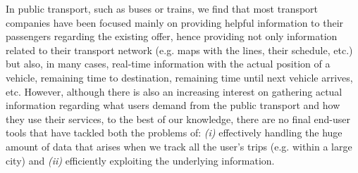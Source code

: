     In public transport, such as buses or trains, we find that most transport companies have been focused mainly on providing helpful information to their passengers regarding the existing offer, hence providing not only information related to their transport network (e.g. maps with the lines, their schedule, etc.) but also, in many cases, real-time information with the actual position of a vehicle, remaining time to destination, remaining time until next vehicle arrives, etc. 
    However, although there is also an increasing interest on gathering actual information regarding what users demand from the public transport and how they use their services, to the best of our knowledge, there are no final end-user tools that have tackled both the problems of: {\em (i)} effectively handling the huge amount of data that arises when we track all the user's trips (e.g. within a large city) and {\em (ii)} efficiently exploiting the underlying information.
    
    
